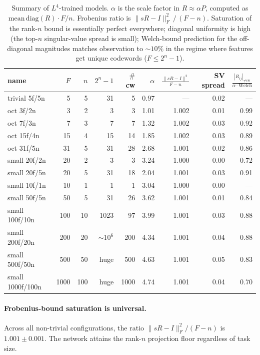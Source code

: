 \documentclass[11pt]{article}
\begin{document}
\begin{table}[h]
\centering
\caption{Summary of $L^4$-trained models. $\alpha$ is the scale factor in
$R \approx \alpha P$, computed as $\mathrm{mean}\,\mathrm{diag}(R) \cdot F/n$.
Frobenius ratio is $\|sR-I\|_F^2 \,/\, (F-n)$. Saturation of the rank-$n$
bound is essentially perfect everywhere; diagonal uniformity is high (the
top-$n$ singular-value spread is small); Welch-bound prediction for the
off-diagonal magnitudes matches observation to $\sim 10\%$ in the regime
where features get unique codewords ($F \le 2^n - 1$).}
\label{tab:scan}
\small
\begin{tabular}{lrrrrrrrr}
\toprule
name & $F$ & $n$ & $2^n{-}1$ & $\#$cw & $\alpha$ & $\frac{\|sR-I\|^2}{F-n}$ & SV spread & $\frac{|R_{ij}|_{\ne\text{cw}}}{\alpha\cdot\text{Welch}}$ \\
\midrule
trivial 5f/5n        & 5    & 5   & 31 & 5   & 0.97 & ---     & 0.02 & --- \\
oct 3f/2n            & 3    & 2   & 3  & 3   & 1.01 & 1.002   & 0.01 & 0.99 \\
oct 7f/3n            & 7    & 3   & 7  & 7   & 1.32 & 1.002   & 0.03 & 0.92 \\
oct 15f/4n           & 15   & 4   & 15 & 14  & 1.85 & 1.002   & 0.03 & 0.89 \\
oct 31f/5n           & 31   & 5   & 31 & 28  & 2.68 & 1.001   & 0.02 & 0.86 \\
small 20f/2n         & 20   & 2   & 3  & 3   & 3.24 & 1.000   & 0.00 & 0.72 \\
small 20f/5n         & 20   & 5   & 31 & 18  & 2.04 & 1.001   & 0.03 & 0.91 \\
small 10f/1n         & 10   & 1   & 1  & 1   & 3.04 & 1.000   & 0.00 & --- \\
small 50f/5n         & 50   & 5   & 31 & 26  & 3.62 & 1.001   & 0.01 & 0.84 \\
small 100f/10n       & 100  & 10  & 1023 & 97  & 3.99 & 1.001   & 0.03 & 0.88 \\
small 200f/20n       & 200  & 20  & $\sim 10^6$ & 200 & 4.34 & 1.001   & 0.04 & 0.88 \\
small 500f/50n       & 500  & 50  & huge & 500 & 4.63 & 1.001   & 0.05 & 0.83 \\
small 1000f/100n     & 1000 & 100 & huge & 1000 & 4.74 & 1.001   & 0.04 & 0.70 \\
\bottomrule
\end{tabular}
\end{table}

\paragraph{Frobenius-bound saturation is universal.} Across all non-trivial
configurations, the ratio $\|sR-I\|_F^2 / (F-n)$ is $1.001 \pm 0.001$. The
network attains the rank-$n$ projection floor regardless of task size.
\end{document}
